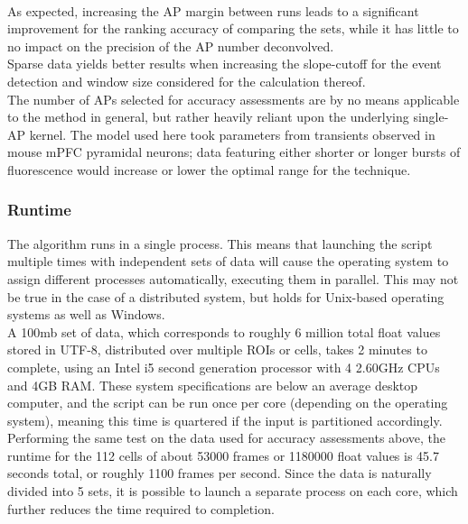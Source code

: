\documentclass[titlepage]{article}
\begin{document}
\\
As expected, increasing the AP margin between runs leads to a significant improvement for the ranking accuracy of comparing the sets, while it has little to no impact on the precision of the AP number deconvolved.\\
Sparse data yields better results when increasing the slope-cutoff for the event detection and window size considered for the calculation thereof.\\
The number of APs selected for accuracy assessments are by no means applicable to the method in general, but rather heavily reliant upon the underlying single-AP kernel. The model used here took parameters from transients observed in mouse mPFC pyramidal neurons; data featuring either shorter or longer bursts of fluorescence would increase or lower the optimal range for the technique.
\subsubsection{Runtime} \label{runtime}
The algorithm runs in a single process. This means that launching the script multiple times with independent sets of data will cause the operating system to assign different processes automatically, executing them in parallel. This may not be true in the case of a distributed system, but holds for Unix-based operating systems as well as Windows.\\
A 100mb set of data, which corresponds to roughly 6 million total float values stored in UTF-8, distributed over multiple ROIs or cells, takes 2 minutes to complete, using an Intel i5 second generation processor with 4 2.60GHz CPUs and 4GB RAM. These system specifications are below an average desktop computer, and the script can be run once per core (depending on the operating system), meaning this time is quartered if the input is partitioned accordingly.\\ 
Performing the same test on the data used for accuracy assessments above, the runtime for the 112 cells of about 53000 frames or 1180000 float values is 45.7 seconds total, or roughly 1100 frames per second. Since the data is naturally divided into 5 sets, it is possible to launch a separate process on each core, which further reduces the time required to completion.
\end{document}
